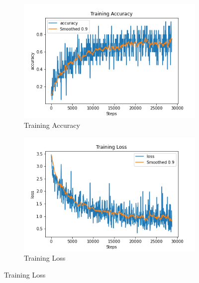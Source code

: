 \begin{figure}[ht!]
     \centering
     \begin{subfigure}[b]{0.3\textwidth}
         \centering
         \includegraphics[width=\textwidth]{./figure/results/baseline_and_blindfolding/training/accuracy.png}
         \caption{Training Accuracy}
         \label{fig:training_accuracy}
     \end{subfigure}
     \hfill
     \begin{subfigure}[b]{0.3\textwidth}
         \centering
         \includegraphics[width=\textwidth]{./figure/results/baseline_and_blindfolding/training/loss.png}
         \caption{Training Loss}

\end{subfigure}
\end{figure}
